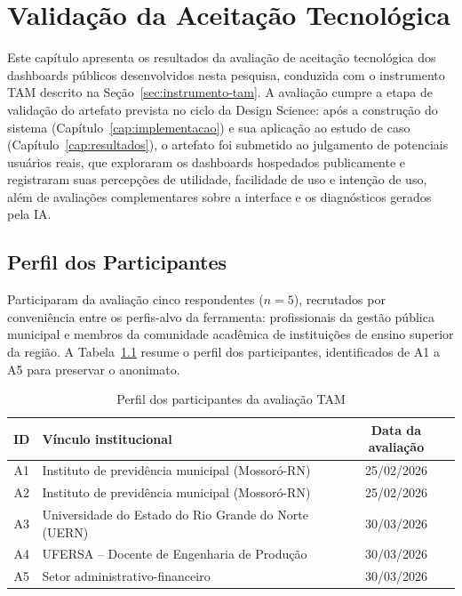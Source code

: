 \chapter{Validação da Aceitação Tecnológica}
\label{cap:validacao-tam}

Este capítulo apresenta os resultados da avaliação de aceitação tecnológica dos dashboards públicos desenvolvidos nesta pesquisa, conduzida com o instrumento TAM descrito na Seção~\ref{sec:instrumento-tam}. A avaliação cumpre a etapa de validação do artefato prevista no ciclo da Design Science: após a construção do sistema (Capítulo~\ref{cap:implementacao}) e sua aplicação ao estudo de caso (Capítulo~\ref{cap:resultados}), o artefato foi submetido ao julgamento de potenciais usuários reais, que exploraram os dashboards hospedados publicamente e registraram suas percepções de utilidade, facilidade de uso e intenção de uso, além de avaliações complementares sobre a interface e os diagnósticos gerados pela IA.

\section{Perfil dos Participantes}
\label{sec:perfil-participantes}

Participaram da avaliação cinco respondentes ($n=5$), recrutados por conveniência entre os perfis-alvo da ferramenta: profissionais da gestão pública municipal e membros da comunidade acadêmica de instituições de ensino superior da região. A Tabela~\ref{tab:perfil-tam} resume o perfil dos participantes, identificados de A1 a A5 para preservar o anonimato.

\begin{table}[h!]
    \centering
    \caption{Perfil dos participantes da avaliação TAM}
    \label{tab:perfil-tam}
    \begin{tabular}{clc}
        \hline
        \textbf{ID} & \textbf{Vínculo institucional} & \textbf{Data da avaliação} \\
        \hline
        A1 & Instituto de previdência municipal (Mossoró-RN) & 25/02/2026 \\
        A2 & Instituto de previdência municipal (Mossoró-RN) & 25/02/2026 \\
        A3 & Universidade do Estado do Rio Grande do Norte (UERN) & 30/03/2026 \\
        A4 & UFERSA -- Docente de Engenharia de Produção & 30/03/2026 \\
        A5 & Setor administrativo-financeiro & 30/03/2026 \\
        \hline
    \end{tabular}
\end{table}

